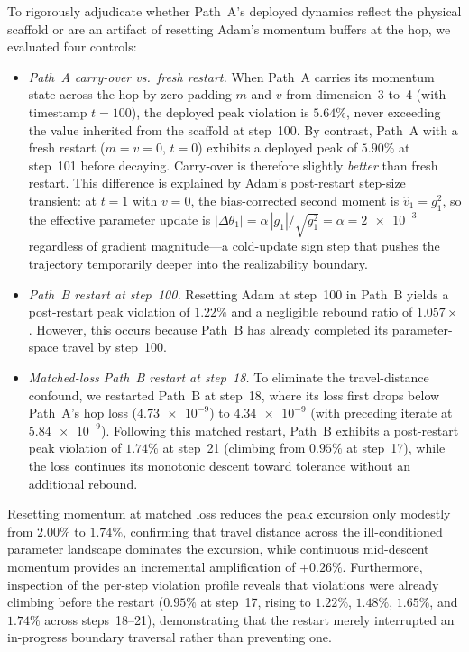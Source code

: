 \documentclass[preprint,aps,prb,longbibliography,superscriptaddress]{revtex4-2}
\begin{document}
To rigorously adjudicate whether Path~A's deployed dynamics reflect the physical
scaffold or are an artifact of resetting Adam's momentum buffers at the hop, we
evaluated four controls:
\begin{itemize}
  \item \textit{Path~A carry-over vs.\ fresh restart.} When Path~A carries its
    momentum state across the hop by zero-padding $m$ and $v$ from dimension~3 to~4
    (with timestamp $t = 100$), the deployed peak violation is $5.64\%$, never
    exceeding the value inherited from the scaffold at step~100. By contrast,
    Path~A with a fresh restart ($m = v = 0$, $t = 0$) exhibits a deployed peak
    of $5.90\%$ at step~101 before decaying. Carry-over is therefore slightly
    \emph{better} than fresh restart.
    This difference is explained by Adam's post-restart step-size transient: at
    $t = 1$ with $v = 0$, the bias-corrected second moment is $\hat{v}_1 = g_1^2$,
    so the effective parameter update is $|\Delta\theta_1| = \alpha\, |g_1|/\sqrt{g_1^2} = \alpha = \num{2e-3}$
    regardless of gradient magnitude---a cold-update sign step that pushes the
    trajectory temporarily deeper into the realizability boundary.
  \item \textit{Path~B restart at step~100.} Resetting Adam at step~100 in Path~B
    yields a post-restart peak violation of $1.22\%$ and a negligible rebound
    ratio of $1.057\times$. However, this occurs because Path~B has already
    completed its parameter-space travel by step~100.
  \item \textit{Matched-loss Path~B restart at step~18.} To eliminate the
    travel-distance confound, we restarted Path~B at step~18, where its loss
    first drops below Path~A's hop loss ($\num{4.73e-9}$) to $\num{4.34e-9}$
    (with preceding iterate at $\num{5.84e-9}$).
    Following this matched restart, Path~B exhibits a post-restart peak violation
    of $1.74\%$ at step~21 (climbing from $0.95\%$ at step~17), while the loss
    continues its monotonic descent toward tolerance without an additional rebound.
\end{itemize}
Resetting momentum at matched loss reduces the peak excursion only modestly from
$2.00\%$ to $1.74\%$, confirming that travel distance across the ill-conditioned
parameter landscape dominates the excursion, while continuous mid-descent momentum
provides an incremental amplification of $+0.26\%$.
Furthermore, inspection of the per-step violation profile reveals that violations were
already climbing before the restart ($0.95\%$ at step~17, rising to $1.22\%$, $1.48\%$,
$1.65\%$, and $1.74\%$ across steps~18--21), demonstrating that the restart merely
interrupted an in-progress boundary traversal rather than preventing one.
\end{document}
